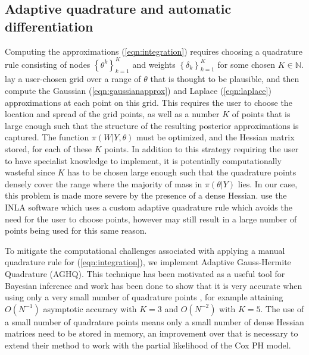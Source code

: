\documentclass[ba]{imsart}
\begin{document}
\subsection{Adaptive quadrature and automatic differentiation}


Computing the approximations (\ref{eqn:integration}) requires choosing a quadrature rule consisting of nodes $\left\{\theta^{k}\right\}_{k=1}^{K}$ and weights $\left\{\delta_{k}\right\}_{k=1}^{K}$ for some chosen $K\in\mathbb{N}$. \cite{casecross} lay a user-chosen grid over a range of $\theta$ that is thought to be plausible, and then compute the Gaussian (\ref{eqn:gaussianapprox}) and Laplace (\ref{eqn:laplace}) approximations at each point on this grid. This requires the user to choose the location and spread of the grid points, as well as a number $K$
of points that is large enough such that the structure of the resulting posterior approximations is captured. The function $\pi(W|Y,\theta)$ must be optimized, and the Hessian matrix stored, for each of these $K$ points. In addition to this strategy requiring the user to have specialist knowledge to implement, it is potentially computationally wasteful since $K$ has to be chosen large enough such that the quadrature points densely cover the range where the majority of mass in $\pi(\theta|Y)$ lies. In our case, this problem is made more severe by the presence of a dense Hessian. \cite{inlacoxph} use the INLA software which uses a custom adaptive quadrature rule which avoids the need for the user to choose points, however may still result in a large number of points being used for this same reason.


To mitigate the computational challenges associated with applying a manual quadrature rule for (\ref{eqn:integration}), we implement Adaptive Gauss-Hermite Quadrature (AGHQ). This technique has been motivated as a useful tool for Bayesian inference \citep{nayloradaptive} and work has been done to show that it is very accurate when using only a very small number of quadrature points \citep{adaptive_GH_1994,adaptive_GH_2020}, for example attaining $O(N^{-1})$ asymptotic accuracy with $K = 3$ and $O(N^{-2})$ with $K = 5$. The use of a small number of quadrature points means only a small number of dense Hessian matrices need to be stored in memory, an improvement over \cite{casecross} that is necessary to extend their method to work with the partial likelihood of the Cox PH model.
\end{document}
